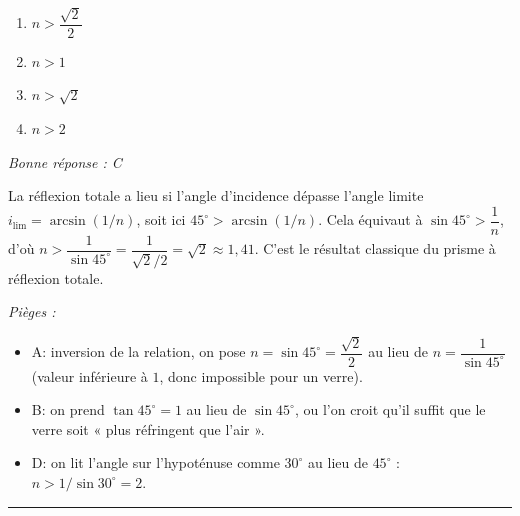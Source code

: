 \documentclass[11pt,a4paper]{article}
\begin{document}
\begin{enumerate}[label=\Alph*)]
\item $n > \dfrac{\sqrt{2}}{2}$
\item $n > 1$
\item $n > \sqrt{2}$
\item $n > 2$
\end{enumerate}
\textit{Bonne réponse : C}\par
La réflexion totale a lieu si l'angle d'incidence dépasse l'angle limite $i_{\text{lim}}=\arcsin(1/n)$, soit ici $45^\circ > \arcsin(1/n)$. Cela équivaut à $\sin 45^\circ > \dfrac{1}{n}$, d'où $n > \dfrac{1}{\sin 45^\circ}=\dfrac{1}{\sqrt{2}/2}=\sqrt{2}\approx 1{,}41$. C'est le résultat classique du prisme à réflexion totale.\par
\textit{Pièges :}
\begin{itemize}
\item A: inversion de la relation, on pose $n=\sin 45^\circ=\dfrac{\sqrt{2}}{2}$ au lieu de $n=\dfrac{1}{\sin 45^\circ}$ (valeur inférieure à $1$, donc impossible pour un verre).
\item B: on prend $\tan 45^\circ=1$ au lieu de $\sin 45^\circ$, ou l'on croit qu'il suffit que le verre soit « plus réfringent que l'air ».
\item D: on lit l'angle sur l'hypoténuse comme $30^\circ$ au lieu de $45^\circ$ : $n>1/\sin 30^\circ = 2$.
\end{itemize}
\vspace{8pt}\hrule\vspace{8pt}
\end{document}
